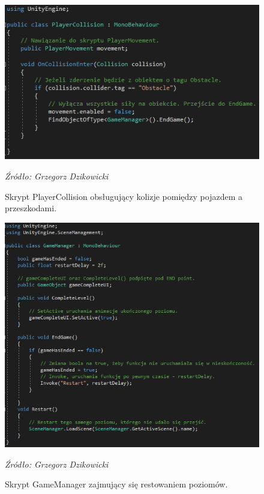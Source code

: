 \begin{figure}[!hbt]
\centering
  \includegraphics[width=1\linewidth]{playercollision.png}
  \caption{Skrypt PlayerCollision obsługujący kolizje pomiędzy pojazdem a przeszkodami.}\label{rys_5}
  \begin{minipage}[t]{0.75\linewidth}
    \emph{Źródło: Grzegorz Dzikowicki}
  \end{minipage}
\end{figure}
\begin{figure}[!ht]
\centering
  \includegraphics[width=1\linewidth]{gamemanager.png}
  \caption{Skrypt GameManager zajmujący się restowaniem poziomów.}\label{rys_6}
  \begin{minipage}[t]{0.75\linewidth}
    \emph{Źródło: Grzegorz Dzikowicki}
  \end{minipage}
\end{figure}

